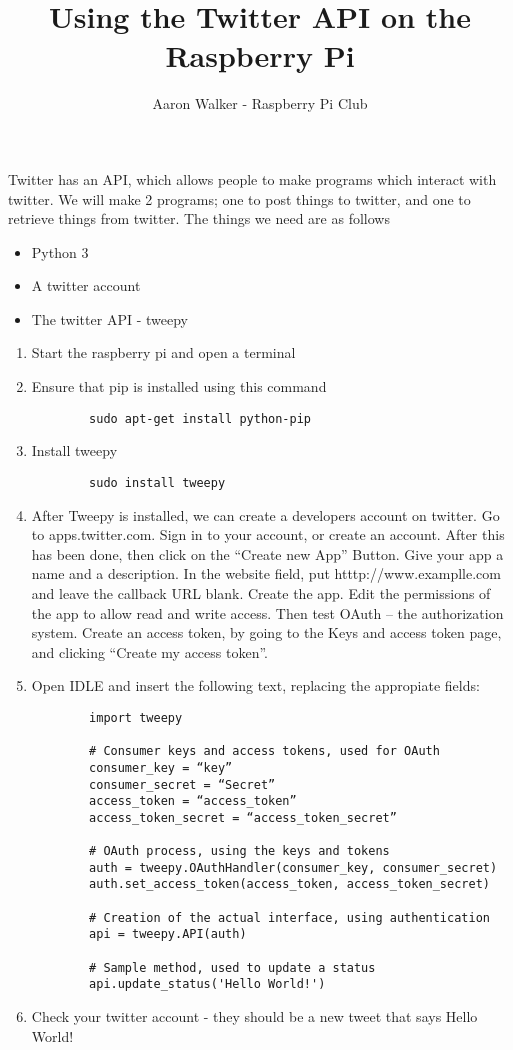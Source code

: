 \documentclass[11pt, oneside]{amsart}
\title{Using the Twitter API on the Raspberry Pi}
\author{Aaron Walker - Raspberry Pi Club}
\begin{document}
\maketitle
  Twitter has an API, which allows people to make programs which interact with twitter. We will make 2 programs; one to post things to twitter, and one to retrieve things from twitter. The things we need are as follows
  \begin{itemize}
    \item Python 3
    \item A twitter account
    \item The twitter API - tweepy
  \end{itemize}
  \begin{enumerate}
    \item Start the raspberry pi and open a terminal
    \item Ensure that pip is installed using this command
      \begin{verbatim}
        sudo apt-get install python-pip
      \end{verbatim}
    \item Install tweepy
      \begin{verbatim}
        sudo install tweepy
      \end{verbatim}
    \item After  Tweepy is installed, we can create a developers account on twitter. Go to apps.twitter.com. Sign in to your account, or create an account. After this has been done, then click on the “Create new App” Button. Give your app a name and a description. In the website field, put htttp://www.examplle.com and leave the callback URL blank. Create the app. Edit the permissions of the app to allow read and write access. Then test OAuth – the authorization system. Create an access token, by going to the Keys and access token page, and clicking “Create my access token”.
    \item Open IDLE and insert the following text, replacing the appropiate fields:
      \begin{verbatim}
        import tweepy

        # Consumer keys and access tokens, used for OAuth
        consumer_key = “key”
        consumer_secret = “Secret”
        access_token = “access_token”
        access_token_secret = “access_token_secret”

        # OAuth process, using the keys and tokens
        auth = tweepy.OAuthHandler(consumer_key, consumer_secret)
        auth.set_access_token(access_token, access_token_secret)

        # Creation of the actual interface, using authentication
        api = tweepy.API(auth)

        # Sample method, used to update a status
        api.update_status('Hello World!')

      \end{verbatim}
    \item Check your twitter account - they should be a new tweet that says Hello World!
  \end{enumerate}
\end{document}
